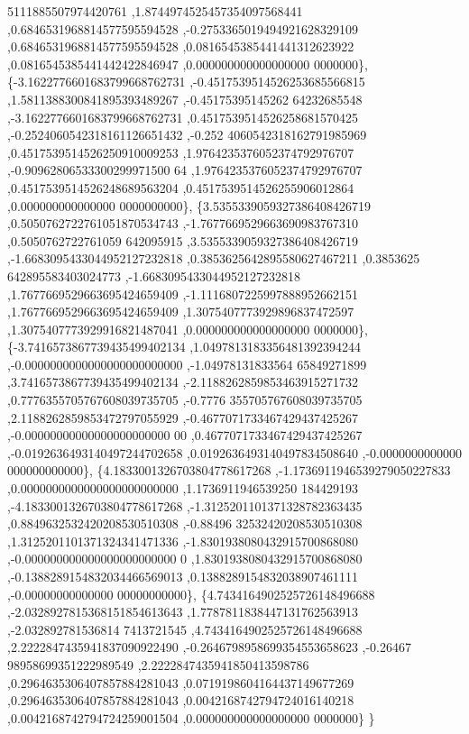 \begin{DoxyCode}
      5111885507974420761 ,1.8744974525457354097568441 ,0.6846531968814577595594528 ,-0.2753365019494921628329109 
      ,0.6846531968814577595594528 ,0.0816545385441441312623922 ,0.0816545385441442422846947 ,0.000000000000000000
      0000000\},
\{-3.1622776601683799668762731 ,-0.4517539514526253685566815 ,1.5811388300841895393489267 ,-0.45175395145262
      64232685548 ,-3.1622776601683799668762731 ,0.4517539514526258681570425 ,-0.2524060542318161126651432 ,-0.252
      4060542318162791985969 ,0.4517539514526250910009253 ,1.9764235376052374792976707 ,-0.90962806533300299971500
      64 ,1.9764235376052374792976707 ,0.4517539514526248689563204 ,0.4517539514526255906012864 ,0.000000000000000
      0000000000\},
\{3.5355339059327386408426719 ,0.5050762722761051870534743 ,-1.7677669529663690983767310 ,0.5050762722761059
      642095915 ,3.5355339059327386408426719 ,-1.6683095433044952127232818 ,0.3853625642895580627467211 ,0.3853625
      642895583403024773 ,-1.6683095433044952127232818 ,1.7677669529663695424659409 ,-1.1116807225997888952662151 
      ,1.7677669529663695424659409 ,1.3075407773929896837472597 ,1.3075407773929916821487041 ,0.000000000000000000
      0000000\},
\{-3.7416573867739435499402134 ,1.0497813183356481392394244 ,-0.0000000000000000000000000 ,-1.04978131833564
      65849271899 ,3.7416573867739435499402134 ,-2.1188262859853463915271732 ,0.7776355705767608039735705 ,-0.7776
      355705767608039735705 ,2.1188262859853472797055929 ,-0.4677071733467429437425267 ,-0.00000000000000000000000
      00 ,0.4677071733467429437425267 ,-0.0192636493140497244702658 ,0.0192636493140497834508640 ,-0.0000000000000
      000000000000\},
\{4.1833001326703804778617268 ,-1.1736911946539279050227833 ,0.0000000000000000000000000 ,1.1736911946539250
      184429193 ,-4.1833001326703804778617268 ,-1.3125201101371328782363435 ,0.8849632532420208530510308 ,-0.88496
      32532420208530510308 ,1.3125201101371324341471336 ,-1.8301938080432915700868080 ,-0.000000000000000000000000
      0 ,1.8301938080432915700868080 ,-0.1388289154832034466569013 ,0.1388289154832038907461111 ,-0.00000000000000
      00000000000\},
\{4.7434164902525726148496688 ,-2.0328927815368151854613643 ,1.7787811838447131762563913 ,-2.032892781536814
      7413721545 ,4.7434164902525726148496688 ,2.2222847435941837090922490 ,-0.2646798958699354553658623 ,-0.26467
      98958699351222989549 ,2.2222847435941850413598786 ,0.2964635306407857884281043 ,0.0719198604164437149677269 
      ,0.2964635306407857884281043 ,0.0042168742794724016140218 ,0.0042168742794724259001504 ,0.000000000000000000
      0000000\}
\}
\end{DoxyCode}
\mbox{\label{a00455_a1ae495767daf956db97ba8bea181c4d8}} 
